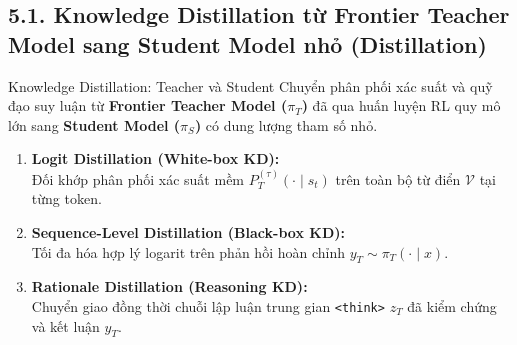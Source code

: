 
\subsection{5.1. Knowledge Distillation từ Frontier Teacher Model sang Student Model nhỏ (Distillation)}

\begin{frame}{Knowledge Distillation: Teacher và Student}
  \small
  Chuyển phân phối xác suất và quỹ đạo suy luận từ \textbf{Frontier Teacher Model ($\pi_T$)} đã qua huấn luyện RL quy mô lớn sang \textbf{Student Model ($\pi_S$)} có dung lượng tham số nhỏ.

  \vspace{0.10cm}
  \small
  \begin{enumerate}\setlength{\itemsep}{4pt}
    \item \textbf{Logit Distillation (White-box KD):}\\
      \small Đối khớp phân phối xác suất mềm $P_T^{(\tau)}(\cdot \mid s_t)$ trên toàn bộ từ điển $\mathcal{V}$ tại từng token.
    \item \textbf{Sequence-Level Distillation (Black-box KD):}\\
      \small Tối đa hóa hợp lý logarit trên phản hồi hoàn chỉnh $y_T \sim \pi_T(\cdot \mid x)$.
    \item \textbf{Rationale Distillation (Reasoning KD):}\\
      \small Chuyển giao đồng thời chuỗi lập luận trung gian \texttt{<think>} $z_T$ đã kiểm chứng và kết luận $y_T$.
  \end{enumerate}
  \par\vspace{0pt}
\end{frame}

